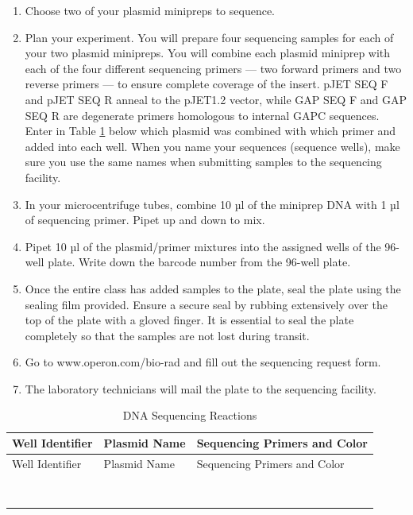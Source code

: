 \documentclass[]{book}
\providecommand{\tightlist}{%
  \setlength{\itemsep}{0pt}\setlength{\parskip}{0pt}}
\theoremstyle{definition}
\theoremstyle{definition}
\theoremstyle{definition}
\theoremstyle{remark}
\begin{document}
\begin{enumerate}
\def\labelenumi{\arabic{enumi}.}
\tightlist
\item
  Choose two of your plasmid minipreps to sequence.
\item
  Plan your experiment. You will prepare four sequencing samples for
  each of your two plasmid minipreps. You will combine each plasmid
  miniprep with each of the four different sequencing primers --- two
  forward primers and two reverse primers --- to ensure complete
  coverage of the insert. pJET SEQ F and pJET SEQ R anneal to the
  pJET1.2 vector, while GAP SEQ F and GAP SEQ R are degenerate primers
  homologous to internal GAPC sequences. Enter in Table \ref{tab:seq}
  below which plasmid was combined with which primer and added into each
  well. When you name your sequences (sequence wells), make sure you use
  the same names when submitting samples to the sequencing facility.
\item
  In your microcentrifuge tubes, combine 10 µl of the miniprep DNA with
  1 µl of sequencing primer. Pipet up and down to mix.
\item
  Pipet 10 µl of the plasmid/primer mixtures into the assigned wells of
  the 96-well plate. Write down the barcode number from the 96-well
  plate.
\item
  Once the entire class has added samples to the plate, seal the plate
  using the sealing film provided. Ensure a secure seal by rubbing
  extensively over the top of the plate with a gloved finger. It is
  essential to seal the plate completely so that the samples are not
  lost during transit.
\item
  Go to www.operon.com/bio-rad and fill out the sequencing request form.
\item
  The laboratory technicians will mail the plate to the sequencing
  facility.
\end{enumerate}

\begin{longtable}[]{@{}lll@{}}
\caption{\label{tab:seq} DNA Sequencing Reactions}\tabularnewline
\toprule
Well Identifier & Plasmid Name & Sequencing Primers and
Color\tabularnewline
\midrule
\endfirsthead
\toprule
Well Identifier & Plasmid Name & Sequencing Primers and
Color\tabularnewline
\midrule
\endhead
& &\tabularnewline
& &\tabularnewline
& &\tabularnewline
& &\tabularnewline
& &\tabularnewline
& &\tabularnewline
& &\tabularnewline
& &\tabularnewline
\bottomrule
\end{longtable}
\end{document}
